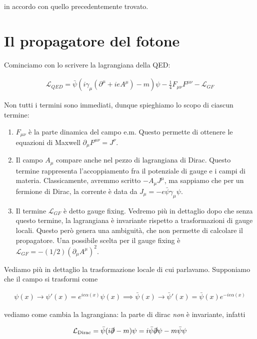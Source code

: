 \documentclass[11pt]{report}
\begin{document}
in accordo con quello precedentemente trovato. 

\section{Il propagatore del fotone}

Cominciamo con lo scrivere la lagrangiana della QED: 

\begin{align}
    \mathcal{L}_{QED} = \bar{\psi}(i \gamma_\mu(\partial^\mu +ieA^\mu) -m)\psi - \frac{1}{4}F_{\mu\nu}F^{\mu\nu} - \mathcal{L}_{GF}
\end{align}

Non tutti i termini sono immediati, dunque spieghiamo lo scopo di ciascun termine: 

\begin{enumerate}
    \item \(F_{\mu\nu}\) è la parte dinamica del campo e.m. Questo permette di ottenere le equazioni di Maxwell \(\partial_\mu F^{\mu\nu} = J^{\nu}\).
    \item Il campo \(A_\mu\) compare anche nel pezzo di lagrangiana di Dirac. Questo termine rappresenta l'accoppiamento fra il potenziale di gauge e i campi di materia. Classicamente, avremmo scritto \(-A_\mu J^\mu\), ma sappiamo che per un fermione di Dirac, la corrente è data da \(J_\mu = -e\bar{\psi}\gamma_\mu \psi\).
    \item Il termine \(\mathcal{L}_{GF}\) è detto gauge fixing. Vedremo più in dettaglio dopo che senza questo termine, la lagrangiana è invariante rispetto a trasformazioni di gauge locali. Questo però genera una ambiguità, che non permette di calcolare il propagatore. Una possibile scelta per il gauge fixing è \(\mathcal{L}_{GF} = -(1/2)(\partial_\mu A^\mu)^2\).  
\end{enumerate}

Vediamo più in dettaglio la trasformazione locale di cui parlavamo. Supponiamo che il campo si trasformi come 

\begin{align}
    \psi(x) \rightarrow \psi'(x) = e^{ie\alpha(x)}\psi(x) \implies \bar{\psi}(x) \rightarrow \bar{\psi}'(x) = \bar{\psi}(x)e^{-ie\alpha(x)}
\end{align}

vediamo come cambia la lagrangiana: la parte di dirac \emph{non} è invariante, infatti 

\begin{align}
    \mathcal{L}_{\text{Dirac}} = \bar{\psi}(i\slashed{\partial} -m)\psi = i \bar{\psi}\slashed{\partial}\psi -m\bar{\psi}\psi
\end{align}
\end{document}
